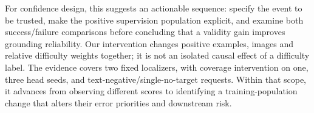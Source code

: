 \documentclass[10pt,twocolumn,letterpaper]{article}
\begin{document}
For confidence design, this suggests an actionable sequence: specify the
event to be trusted, make the positive supervision population explicit,
and examine both success/failure comparisons before concluding that a
validity gain improves grounding reliability. Our intervention changes
positive examples, images and relative difficulty weights together; it is
not an isolated causal effect of a difficulty label. The evidence covers
two fixed localizers, with coverage intervention on one, three head seeds,
and text-negative/single-no-target requests. Within that scope, it advances
from observing different scores to identifying a training-population change
that alters their error priorities and downstream risk.

\FloatBarrier
{\small}
\end{document}
